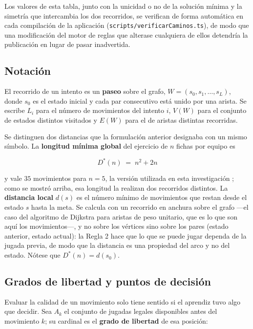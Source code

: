 \documentclass{book}
\begin{document}
Los valores de esta tabla, junto con la unicidad o no de la solución
mínima y la simetría que intercambia los dos recorridos, se verifican de
forma automática en cada compilación de la aplicación
(\texttt{scripts/verificarCaminos.ts}), de modo que una modificación del
motor de reglas que alterase cualquiera de ellos detendría la
publicación en lugar de pasar inadvertida.

\subsection*{Notación}

El recorrido de un intento es un \textbf{paseo} sobre el grafo,
$W = (s_0, s_1, \ldots, s_{L})$, donde $s_0$ es el estado inicial y
cada par consecutivo está unido por una arista. Se escribe $L_i$
para el número de movimientos del intento $i$, $V(W)$ para el
conjunto de estados distintos visitados y $E(W)$ para el de aristas
distintas recorridas.

Se distinguen dos distancias que la formulación anterior designaba
con un mismo símbolo. La \textbf{longitud mínima global} del ejercicio
de $n$ fichas por equipo es

\begin{equation}
    D^{*}(n) \;=\; n^{2} + 2n
    \label{eq:optimo}
\end{equation}

y vale $35$ movimientos para $n=5$, la versión utilizada en esta
investigación \cite{LievanoMolina2022, PaezGonzalez2022}; como se
mostró arriba, esa longitud la realizan dos recorridos distintos. La
\textbf{distancia local} $d(s)$ es el número mínimo de movimientos que
restan desde el estado $s$ hasta la meta. Se calcula con un recorrido
en anchura sobre el grafo —el caso del algoritmo de Dijkstra
\cite{Dijkstra1959} para aristas de peso unitario, que es lo que son
aquí los movimientos—, y no sobre los vértices sino sobre los pares
(estado anterior, estado actual): la Regla 2 hace que lo que se puede
jugar dependa de la jugada previa, de modo que la distancia es una
propiedad del arco y no del estado. Nótese que $D^{*}(n) = d(s_0)$.

\subsection*{Grados de libertad y puntos de decisión}

Evaluar la calidad de un movimiento solo tiene sentido si el
aprendiz tuvo algo que decidir. Sea $A_k$ el conjunto de jugadas
legales disponibles antes del movimiento $k$; su cardinal es el
\textbf{grado de libertad} de esa posición:
\end{document}
